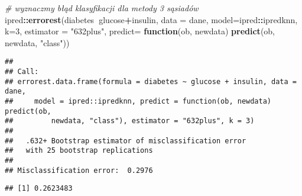 \documentclass[polish,]{book}
\newenvironment{Shaded}{\begin{snugshade}}{\end{snugshade}}
\newcommand{\CommentTok}[1]{\textcolor[rgb]{0.56,0.35,0.01}{\textit{#1}}}
\newcommand{\ControlFlowTok}[1]{\textcolor[rgb]{0.13,0.29,0.53}{\textbf{#1}}}
\newcommand{\DataTypeTok}[1]{\textcolor[rgb]{0.13,0.29,0.53}{#1}}
\newcommand{\DecValTok}[1]{\textcolor[rgb]{0.00,0.00,0.81}{#1}}
\newcommand{\KeywordTok}[1]{\textcolor[rgb]{0.13,0.29,0.53}{\textbf{#1}}}
\newcommand{\NormalTok}[1]{#1}
\newcommand{\OperatorTok}[1]{\textcolor[rgb]{0.81,0.36,0.00}{\textbf{#1}}}
\newcommand{\StringTok}[1]{\textcolor[rgb]{0.31,0.60,0.02}{#1}}
\begin{document}
\begin{Shaded}
\begin{Highlighting}[]
\CommentTok{# wyznaczmy błąd klasyfikacji dla metody 3 sąsiadów}
\NormalTok{ipred}\OperatorTok{::}\KeywordTok{errorest}\NormalTok{(diabetes}\OperatorTok{~}\NormalTok{glucose}\OperatorTok{+}\NormalTok{insulin, }\DataTypeTok{data =}\NormalTok{ dane, }\DataTypeTok{model=}\NormalTok{ipred}\OperatorTok{::}\NormalTok{ipredknn, }\DataTypeTok{k=}\DecValTok{3}\NormalTok{,}
                \DataTypeTok{estimator =} \StringTok{"632plus"}\NormalTok{,}
                \DataTypeTok{predict=} \ControlFlowTok{function}\NormalTok{(ob, newdata) }\KeywordTok{predict}\NormalTok{(ob, newdata, }\StringTok{"class"}\NormalTok{))}
\end{Highlighting}
\end{Shaded}

\begin{verbatim}
## 
## Call:
## errorest.data.frame(formula = diabetes ~ glucose + insulin, data = dane, 
##     model = ipred::ipredknn, predict = function(ob, newdata) predict(ob, 
##         newdata, "class"), estimator = "632plus", k = 3)
## 
##   .632+ Bootstrap estimator of misclassification error 
##   with 25 bootstrap replications
## 
## Misclassification error:  0.2976
\end{verbatim}

\begin{Shaded}
\end{Shaded}

\begin{verbatim}
## [1] 0.2623483
\end{verbatim}
\end{document}
